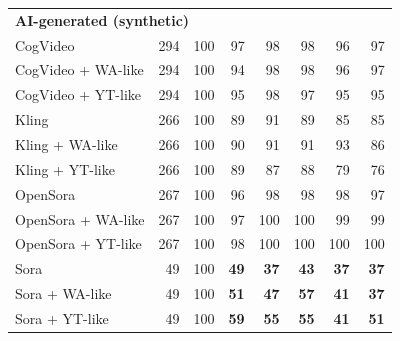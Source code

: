 \documentclass[11pt,a4paper]{article}
\begin{document}
{\begin{longtable}{p{7.2cm}rrrrrrr}
\midrule\multicolumn{8}{l}{\textbf{AI-generated (synthetic)}} \\
CogVideo & 294 & 100 & 97 & 98 & 98 & 96 & 97 \\
CogVideo + WA-like & 294 & 100 & 94 & 98 & 98 & 96 & 97 \\
CogVideo + YT-like & 294 & 100 & 95 & 98 & 97 & 95 & 95 \\
Kling & 266 & 100 & 89 & 91 & 89 & 85 & 85 \\
Kling + WA-like & 266 & 100 & 90 & 91 & 91 & 93 & 86 \\
Kling + YT-like & 266 & 100 & 89 & 87 & 88 & 79 & 76 \\
OpenSora & 267 & 100 & 96 & 98 & 98 & 98 & 97 \\
OpenSora + WA-like & 267 & 100 & 97 & 100 & 100 & 99 & 99 \\
OpenSora + YT-like & 267 & 100 & 98 & 100 & 100 & 100 & 100 \\
Sora & 49 & 100 & \textbf{49} & \textbf{37} & \textbf{43} & \textbf{37} & \textbf{37} \\
Sora + WA-like & 49 & 100 & \textbf{51} & \textbf{47} & \textbf{57} & \textbf{41} & \textbf{37} \\
Sora + YT-like & 49 & 100 & \textbf{59} & \textbf{55} & \textbf{55} & \textbf{41} & \textbf{51} \\
\end{longtable}}
\end{document}
